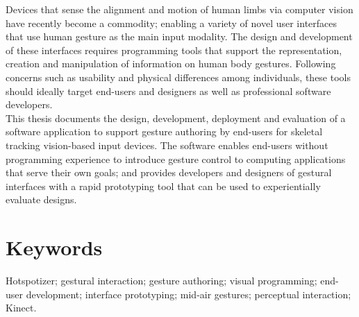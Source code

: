 \noindent Devices that sense the alignment and motion of human limbs via computer vision have recently become a commodity; enabling a variety of novel user interfaces that use human gesture as the main input modality. The design and development of these interfaces requires programming tools that support the representation, creation and manipulation of information on human body gestures. Following concerns such as usability and physical differences among individuals, these tools should ideally target end-users and designers as well as professional software developers.\\[1mm]

\noindent This thesis documents the design, development, deployment and evaluation of a software application to support gesture authoring by end-users for skeletal tracking vision-based input devices. The software enables end-users without programming experience to introduce gesture control to computing applications that serve their own goals; and provides developers and designers of gestural interfaces with a rapid prototyping tool that can be used to experientially evaluate designs.

\section*{Keywords}

\noindent Hotspotizer; gestural interaction; gesture authoring; visual programming; end-user development; interface prototyping; mid-air gestures; perceptual interaction; Kinect.